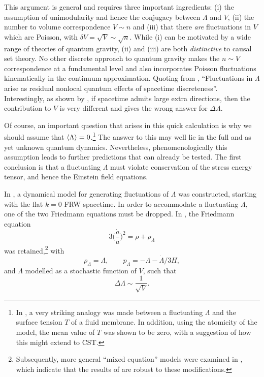 This argument is general and requires three 
important ingredients: (i)  the assumption of unimodularity and hence the  conjugacy between $\Lambda$ and $V$, (ii) the
number to volume correspondence $V \sim n$ and (iii)  that there \emph{are}  fluctuations in $V$ which are  Poisson, with
$\delta V = \sqrt{V} \sim \sqrt{n}$. While (i) can be
motivated by a wide range of theories of quantum gravity, (ii) and (iii)  are both  \emph{distinctive} to causal set theory.  No other discrete approach to quantum gravity makes
the $n \sim V$ correspondence at a fundamental level and also  incorporates  Poisson
fluctuations kinematically in the continuum approximation. Quoting from \cite{lambdaone}, {``Fluctuations in $\Lambda$  arise as residual nonlocal quantum effects of
spacetime discreteness''}.   Interestingly, as shown by \cite{sorkinledl},  if spacetime admits large extra directions, then the contribution to $V$ is
very different and gives the wrong answer for $\Delta \Lambda$.   

Of course, an important question that arises in this quick calculation is  why we should assume that $\langle {\Lambda} \rangle=0$.\footnote{In
  \cite{samsupurna}, a very striking analogy was made between   a fluctuating $\Lambda$ and the surface tension $T$ of  a
  fluid
  membrane. In addition, using the atomicity of the model, the mean value of $T$ was shown to be zero, with a suggestion
of how this might extend to  CST.} The answer to
this may well lie in the  full and as yet unknown quantum dynamics. Nevertheless, phenomenologically  this assumption leads to further predictions that can
already be tested. The first conclusion is that a fluctuating $\Lambda$ must violate conservation of the stress energy
tensor, and hence the Einstein field equations. 

In \cite{lambdathree}, a dynamical model for generating fluctuations of $\Lambda$ was constructed, starting with the flat
$k=0$ FRW spacetime. In order to accommodate a fluctuating $\Lambda$, one of the two Friedmann equations   
must be dropped.  In \cite{lambdathree}, the Friedmann equation
\begin{equation} 
3\biggl(\frac{\dot{a}}{a}\biggr)^2= \rho + \rho_\Lambda 
\end{equation}
was retained,\footnote{Subsequently, more general ``mixed equation'' models were examined in \cite{eptwo}, which
  indicate that the results of \cite{lambdathree} are robust to these modifications.}  with  
\begin{equation}
  \rho_\Lambda =\Lambda, \qquad p_\Lambda= -\Lambda -\dot{\Lambda}/3H, 
 \end{equation} 
and  $\Lambda$ modelled as a stochastic function of $V$, such that
 \begin{equation}
   \Delta \Lambda \sim \frac{1}{\sqrt{V}}.
   \end{equation} 

